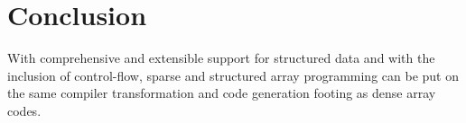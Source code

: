 \section{Conclusion}
With comprehensive and extensible support for structured data and with the inclusion of control-flow, sparse and structured array programming can be put on the same compiler transformation and code generation footing as dense array codes\cite{fred-taco}.